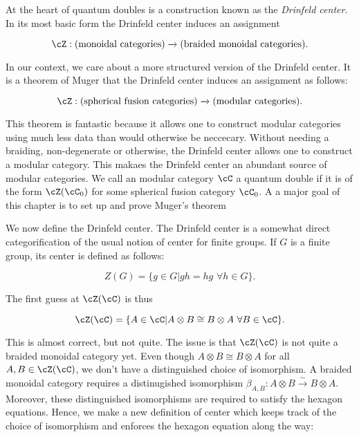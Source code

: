 At the heart of quantum doubles is a construction known as the \textit{Drinfeld center}. In its most basic form the Drinfeld center induces an assignment

$$\cZ: (\text{monoidal categories})\xrightarrow{}(\text{braided monoidal categories}).$$

In our context, we care about a more structured version of the Drinfeld center. It is a theorem of Muger that the Drinfeld center induces an assignment as follows:

$$\cZ: (\text{spherical fusion categories})\xrightarrow{}(\text{modular categories}).$$

This theorem is fantastic because it allows one to construct modular categories using much less data than would otherwise be neccecary. Without needing a braiding, non-degenerate or otherwise, the Drinfeld center allows one to construct a modular category. This makaes the Drinfeld center an abundant source of modular categories. We call an modular category $\cC$ a quantum double if it is of the form $\cZ(\cC_0)$ for some spherical fusion category $\cC_0$. A a major goal of this chapter is to set up and prove Muger's theorem

We now define the Drinfeld center. The Drinfeld center is a somewhat direct categorification of the usual notion of center for finite groups. If $G$ is a finite group, its center is defined as follows:

$$Z(G)=\{g\in G | gh=hg \,\, \forall h\in G\}.$$

The first guess at $\cZ(\cC)$ is thus

$$\cZ(\cC)=\{A\in \cC | A\otimes B \cong B\otimes A \,\, \forall B\in \cC\}.$$

This is almost correct, but not quite. The issue is that $\cZ(\cC)$ is not quite a braided monoidal category yet. Even though $A\otimes B\cong B\otimes A$ for all $A,B\in \cZ(\cC)$, we don't have a distinguished choice of isomorphism. A braided monoidal category requires a distinugished isomorphism $\beta_{A,B}:A\otimes B\xrightarrow{\sim} B\otimes A$. Moreover, these distinguished isomorphisms are required to satisfy the hexagon equations. Hence, we make a new definition of center which keeps track of the choice of isomorphism and enforces the hexagon equation along the way:



